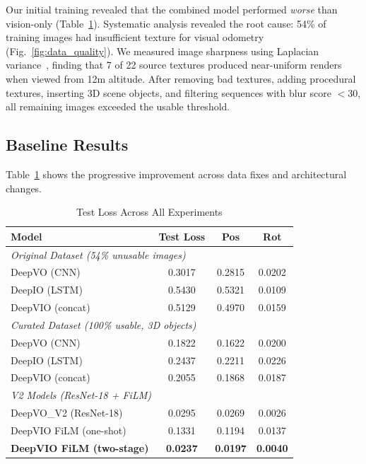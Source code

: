\documentclass[conference]{IEEEtran}
\begin{document}
Our initial training revealed that the combined model performed \textit{worse} than vision-only (Table~\ref{tab:main_results}). Systematic analysis revealed the root cause: 54\% of training images had insufficient texture for visual odometry (Fig.~\ref{fig:data_quality}). We measured image sharpness using Laplacian variance~\cite{pech2000}, finding that 7 of 22 source textures produced near-uniform renders when viewed from 12m altitude. After removing bad textures, adding procedural textures, inserting 3D scene objects, and filtering sequences with blur score $<30$, all remaining images exceeded the usable threshold.

\subsection{Baseline Results}

Table~\ref{tab:main_results} shows the progressive improvement across data fixes and architectural changes.

\begin{table}[t]
\centering
\caption{Test Loss Across All Experiments}
\label{tab:main_results}
\begin{tabular}{@{}lccc@{}}
\toprule
\textbf{Model} & \textbf{Test Loss} & \textbf{Pos} & \textbf{Rot} \\
\midrule
\multicolumn{4}{l}{\textit{Original Dataset (54\% unusable images)}} \\
DeepVO (CNN) & 0.3017 & 0.2815 & 0.0202 \\
DeepIO (LSTM) & 0.5430 & 0.5321 & 0.0109 \\
DeepVIO (concat) & 0.5129 & 0.4970 & 0.0159 \\
\midrule
\multicolumn{4}{l}{\textit{Curated Dataset (100\% usable, 3D objects)}} \\
DeepVO (CNN) & 0.1822 & 0.1622 & 0.0200 \\
DeepIO (LSTM) & 0.2437 & 0.2211 & 0.0226 \\
DeepVIO (concat) & 0.2055 & 0.1868 & 0.0187 \\
\midrule
\multicolumn{4}{l}{\textit{V2 Models (ResNet-18 + FiLM)}} \\
DeepVO\_V2 (ResNet-18) & 0.0295 & 0.0269 & 0.0026 \\
DeepVIO FiLM (one-shot) & 0.1331 & 0.1194 & 0.0137 \\
\textbf{DeepVIO FiLM (two-stage)} & \textbf{0.0237} & \textbf{0.0197} & \textbf{0.0040} \\
\bottomrule
\end{tabular}
\end{table}
\end{document}
